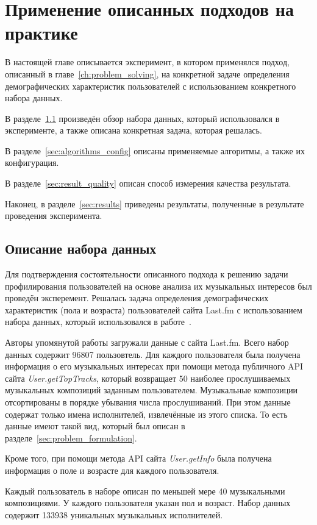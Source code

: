 \chapter{Применение описанных подходов на практике}

В настоящей главе описывается эксперимент, в котором применялся
подход, описанный в главе~\ref{ch:problem_solving}, на
конкретной задаче определения демографических характеристик
пользователей с использованием конкретного набора данных.

В разделе~\ref{sec:dataset} произведён обзор набора данных,
который использовался в эксперименте, а также описана
конкретная задача, которая решалась.

В разделе~\ref{sec:algorithms_config} описаны применяемые
алгоритмы, а также их конфигурация.

В разделе~\ref{sec:result_quality} описан способ измерения
качества результата.

Наконец, в разделе~\ref{sec:results} приведены результаты,
полученные в результате проведения эксперимента.

\section{Описание набора данных}
\label{sec:dataset}

Для подтверждения состоятельности описанного подхода к решению задачи
профилирования пользователей на основе анализа их музыкальных
интересов был проведён эксперемент. Решалась задача определения
демографических характеристик (пола и возраста) пользователей сайта 
Last.fm с использованием набора данных, который использовался в
работе~\cite{wu2014gender}.

Авторы упомянутой работы загружали данные с сайта Last.fm. Всего набор
данных содержит 96807 пользовтель. Для каждого пользователя была
получена информация о его музыкальных интересах при помощи метода
публичного API сайта \textit{User.getTopTracks}, который возвращает
50 наиболее прослушиваемых музыкальных композиций заданным пользователем. 
Музыкальные композиции отсортированы в порядке убывания числа прослушиваний.
При этом данные содержат только имена исполнителей, извлечённые из этого списка.
То есть данные имеют такой вид, который был описан в 
разделе~\ref{sec:problem_formulation}. 

Кроме того, при помощи метода API сайта \textit{User.getInfo}
была получена информация о поле и возрасте для каждого пользователя.

Каждый пользователь в наборе описан по меньшей мере 40
музыкальными композициями. У каждого пользователя указан пол и возраст.
Набор данных содержит 133938 уникальных музыкальных исполнителей.

